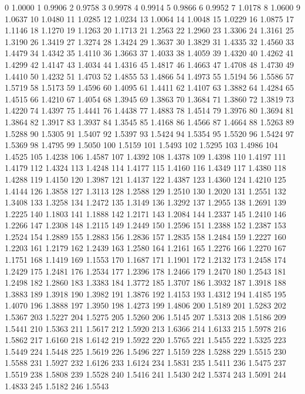 0 1.0000
1 0.9906
2 0.9758
3 0.9978
4 0.9914
5 0.9866
6 0.9952
7 1.0178
8 1.0600
9 1.0637
10 1.0480
11 1.0285
12 1.0234
13 1.0064
14 1.0048
15 1.0229
16 1.0875
17 1.1146
18 1.1270
19 1.1263
20 1.1713
21 1.2563
22 1.2960
23 1.3306
24 1.3161
25 1.3190
26 1.3419
27 1.3274
28 1.3424
29 1.3637
30 1.3829
31 1.4335
32 1.4560
33 1.4479
34 1.4342
35 1.4110
36 1.3663
37 1.4033
38 1.4059
39 1.4320
40 1.4262
41 1.4299
42 1.4147
43 1.4034
44 1.4316
45 1.4817
46 1.4663
47 1.4708
48 1.4730
49 1.4410
50 1.4232
51 1.4703
52 1.4855
53 1.4866
54 1.4973
55 1.5194
56 1.5586
57 1.5719
58 1.5173
59 1.4596
60 1.4095
61 1.4411
62 1.4107
63 1.3882
64 1.4284
65 1.4515
66 1.4210
67 1.4054
68 1.3945
69 1.3863
70 1.3684
71 1.3860
72 1.3819
73 1.4220
74 1.4397
75 1.4441
76 1.4438
77 1.4883
78 1.4514
79 1.3976
80 1.3694
81 1.3864
82 1.3917
83 1.3937
84 1.3545
85 1.4168
86 1.4566
87 1.4664
88 1.5263
89 1.5288
90 1.5305
91 1.5407
92 1.5397
93 1.5424
94 1.5354
95 1.5520
96 1.5424
97 1.5369
98 1.4795
99 1.5050
100 1.5159
101 1.5493
102 1.5295
103 1.4986
104 1.4525
105 1.4238
106 1.4587
107 1.4392
108 1.4378
109 1.4398
110 1.4197
111 1.4179
112 1.4324
113 1.4248
114 1.4177
115 1.4160
116 1.4349
117 1.4380
118 1.4288
119 1.4150
120 1.3987
121 1.4137
122 1.4387
123 1.4360
124 1.4210
125 1.4144
126 1.3858
127 1.3113
128 1.2588
129 1.2510
130 1.2020
131 1.2551
132 1.3408
133 1.3258
134 1.2472
135 1.3149
136 1.3292
137 1.2955
138 1.2691
139 1.2225
140 1.1803
141 1.1888
142 1.2171
143 1.2084
144 1.2337
145 1.2410
146 1.2266
147 1.2308
148 1.2115
149 1.2449
150 1.2596
151 1.2388
152 1.2387
153 1.2524
154 1.2889
155 1.2883
156 1.2836
157 1.2835
158 1.2484
159 1.2227
160 1.2203
161 1.2179
162 1.2439
163 1.2580
164 1.2161
165 1.2276
166 1.2270
167 1.1751
168 1.1419
169 1.1553
170 1.1687
171 1.1901
172 1.2132
173 1.2458
174 1.2429
175 1.2481
176 1.2534
177 1.2396
178 1.2466
179 1.2470
180 1.2543
181 1.2498
182 1.2860
183 1.3383
184 1.3772
185 1.3707
186 1.3932
187 1.3918
188 1.3883
189 1.3918
190 1.3982
191 1.3876
192 1.4153
193 1.4312
194 1.4185
195 1.4070
196 1.3888
197 1.3950
198 1.4273
199 1.4806
200 1.5189
201 1.5283
202 1.5367
203 1.5227
204 1.5275
205 1.5260
206 1.5145
207 1.5313
208 1.5186
209 1.5441
210 1.5363
211 1.5617
212 1.5920
213 1.6366
214 1.6133
215 1.5978
216 1.5862
217 1.6160
218 1.6142
219 1.5922
220 1.5765
221 1.5455
222 1.5325
223 1.5449
224 1.5448
225 1.5619
226 1.5496
227 1.5159
228 1.5288
229 1.5515
230 1.5588
231 1.5927
232 1.6126
233 1.6124
234 1.5831
235 1.5411
236 1.5475
237 1.5519
238 1.5808
239 1.5528
240 1.5416
241 1.5430
242 1.5374
243 1.5091
244 1.4833
245 1.5182
246 1.5543
